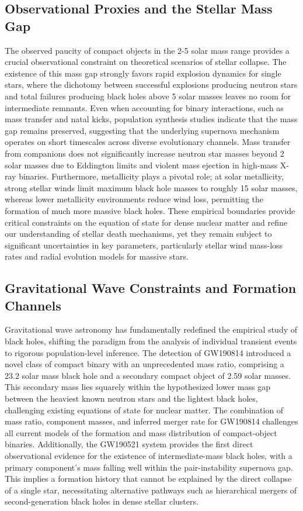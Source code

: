 \documentclass[conference]{IEEEtran}
\begin{document}
\subsection{Observational Proxies and the Stellar Mass Gap}
The observed paucity of compact objects in the 2-5 solar mass range provides a crucial observational constraint on theoretical scenarios of stellar collapse. The existence of this mass gap strongly favors rapid explosion dynamics for single stars, where the dichotomy between successful explosions producing neutron stars and total failures producing black holes above 5 solar masses leaves no room for intermediate remnants. Even when accounting for binary interactions, such as mass transfer and natal kicks, population synthesis studies indicate that the mass gap remains preserved, suggesting that the underlying supernova mechanism operates on short timescales across diverse evolutionary channels. Mass transfer from companions does not significantly increase neutron star masses beyond 2 solar masses due to Eddington limits and violent mass ejection in high-mass X-ray binaries. Furthermore, metallicity plays a pivotal role; at solar metallicity, strong stellar winds limit maximum black hole masses to roughly 15 solar masses, whereas lower metallicity environments reduce wind loss, permitting the formation of much more massive black holes. These empirical boundaries provide critical constraints on the equation of state for dense nuclear matter and refine our understanding of stellar death mechanisms, yet they remain subject to significant uncertainties in key parameters, particularly stellar wind mass-loss rates and radial evolution models for massive stars.

\subsection{Gravitational Wave Constraints and Formation Channels}
Gravitational wave astronomy has fundamentally redefined the empirical study of black holes, shifting the paradigm from the analysis of individual transient events to rigorous population-level inference. The detection of GW190814 introduced a novel class of compact binary with an unprecedented mass ratio, comprising a 23.2 solar mass black hole and a secondary compact object of 2.59 solar masses. This secondary mass lies squarely within the hypothesized lower mass gap between the heaviest known neutron stars and the lightest black holes, challenging existing equations of state for nuclear matter. The combination of mass ratio, component masses, and inferred merger rate for GW190814 challenges all current models of the formation and mass distribution of compact-object binaries. Additionally, the GW190521 system provides the first direct observational evidence for the existence of intermediate-mass black holes, with a primary component's mass falling well within the pair-instability supernova gap. This implies a formation history that cannot be explained by the direct collapse of a single star, necessitating alternative pathways such as hierarchical mergers of second-generation black holes in dense stellar clusters.~\cite{cite_f634820e22d7a238}
\end{document}
